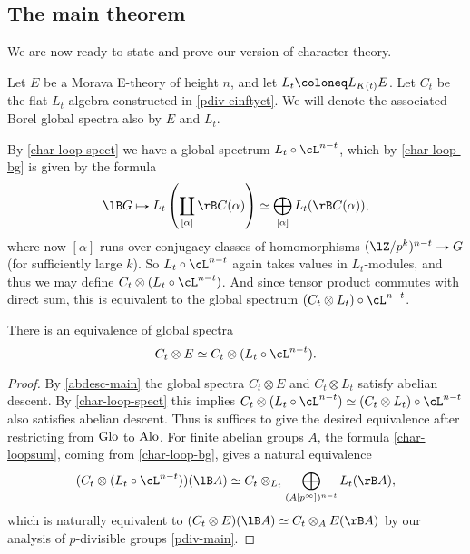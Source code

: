 
\subsection{The main theorem}
\label{char-main}

We are now ready to state and prove our version of character theory.

\begin{notation}
  \label{char-finalntn}
  Let $E$ be a Morava E-theory of height $n$, and let
  $L_t \ce L_{K(t)}E$. Let $C_t$ be the flat $L_t$-algebra constructed
  in \cref{pdiv-einftyct}. We will denote the associated Borel global
  spectra also by $E$ and $L_t$.
\end{notation}

\begin{nothing}
  \label{char-tensloop}
  By \cref{char-loop-spect} we have a global spectrum
  $L_t \circ \cL^{n-t}$, which by \cref{char-loop-bg} is given by the
  formula
  \begin{equation}
    \label{char-loopsum}
    \lB G \mapsto
    L_t\l( \coprod_{[\alpha]} \rB C(\alpha) \r) \iso
    \bigoplus_{[\alpha]} L_t(\rB C(\alpha)),
  \end{equation}
  where now $[\alpha]$ runs over conjugacy classes of homomorphisms
  $(\lZ/p^k)^{n-t} \to G$ (for sufficiently large $k$). So
  $L_t \circ \cL^{n-t}$ again takes values in $L_t$-modules, and thus
  we may define $C_t \otimes (L_t \circ \cL^{n-t})$. And since tensor
  product commutes with direct sum, this is equivalent to the global
  spectrum $(C_t \otimes L_t) \circ \cL^{n-t}$.
\end{nothing}


\begin{theorem}
  \label{char-char}
  There is an equivalence of global spectra
  \[
  C_t \otimes E \iso C_t \otimes (L_t \circ \cL^{n-t}).
  \]
\end{theorem}

\begin{proof}
  By \cref{abdesc-main} the global spectra $C_t \otimes E$ and
  $C_t \otimes L_t$ satisfy abelian descent. By \cref{char-loop-spect}
  this implies
  $C_t \otimes (L_t \circ \cL^{n-t}) \iso (C_t \otimes L_t) \circ
  \cL^{n-t}$
  also satisfies abelian descent. Thus is suffices to give the desired
  equivalence after restricting from $\mathrm{Glo}$ to $\mathrm{Alo}$. For finite
  abelian groups $A$, the formula \cref{char-loopsum}, coming from
  \cref{char-loop-bg}, gives a natural equivalence
  \[
  (C_t \otimes (L_t \circ \cL^{n-t}))(\lB A) \iso
  C_t \otimes_{L_t} \bigoplus_{(A[p^\infty])^{n-t}} L_t(\rB A),
  \]
  which is naturally equivalent to
  $(C_t \otimes E)(\lB A) \iso C_t \otimes_A E(\rB A)$ by our analysis
  of $p$-divisible groups \cref{pdiv-main}.
\end{proof}

